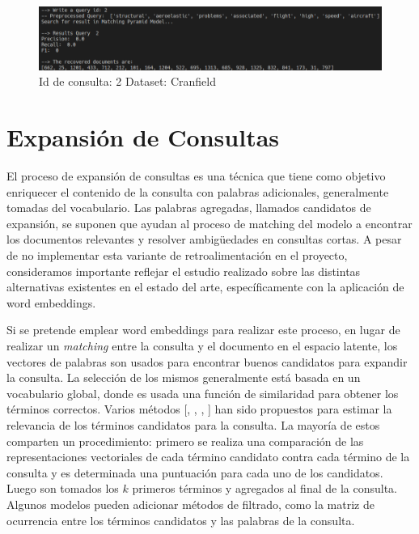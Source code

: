 \documentclass{llncs}
\begin{document}
\begin{figure}
	\begin{center}
		\includegraphics[width=\linewidth]{ ./images/mpcran.png}
		\caption{ Id de consulta: 2 Dataset: Cranfield }
		\label{mpcran}
	\end{center}
\end{figure}

\section{Expansión de Consultas}
El proceso de expansión de consultas es una técnica que tiene como objetivo enriquecer el contenido de la consulta con palabras adicionales, generalmente tomadas del vocabulario. Las palabras agregadas, llamados candidatos de expansión, se suponen que ayudan al proceso de matching del modelo a encontrar los documentos relevantes y resolver ambig\"uedades en consultas cortas. A pesar de no implementar esta variante de retroalimentación en el proyecto, consideramos importante reflejar el estudio realizado sobre las distintas alternativas existentes en el estado del arte, específicamente con la aplicación de word embeddings.  

Si se pretende emplear word embeddings para realizar este proceso, en lugar de realizar un \textit{matching} entre la consulta y el documento en el espacio latente, los vectores de palabras son usados para encontrar buenos candidatos para expandir la consulta. La selección de los mismos generalmente está basada en un vocabulario global, donde es usada una función de similaridad para obtener los términos correctos. Varios métodos [\cite{160}, \cite{190}, \cite{191}, \cite{165}] han sido propuestos para estimar la relevancia de los términos candidatos para la consulta. La mayoría de estos comparten un procedimiento: primero se realiza una comparación de las representaciones vectoriales de cada término candidato contra cada término de la consulta y es determinada una puntuación para cada uno de los candidatos. Luego son tomados los $k$ primeros términos y agregados al final de la consulta. Algunos modelos \cite{192} pueden adicionar métodos de filtrado, como la matriz de ocurrencia entre los términos candidatos y las palabras de la consulta. 
\end{document}
